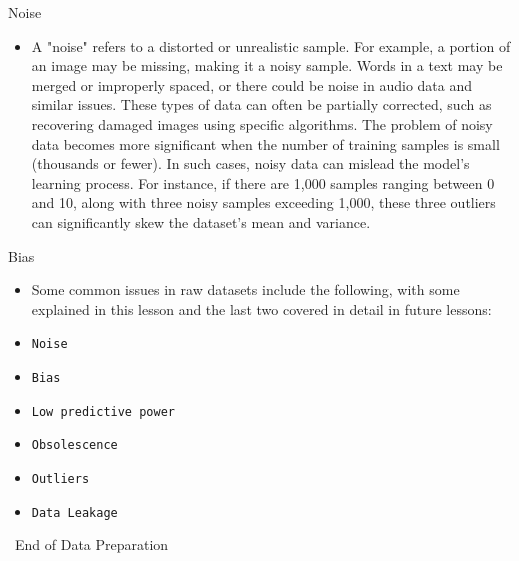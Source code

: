 \documentclass[serif, aspectratio=169]{beamer}
\begin{document}
\begin{frame}{Noise}
    \begin{itemize}
        \item A "noise" refers to a distorted or unrealistic sample. For example, a portion of an image may be missing, making it a noisy sample. Words in a text may be merged or improperly spaced, or there could be noise in audio data and similar issues. These types of data can often be partially corrected, such as recovering damaged images using specific algorithms. The problem of noisy data becomes more significant when the number of training samples is small (thousands or fewer). In such cases, noisy data can mislead the model's learning process. For instance, if there are 1,000 samples ranging between 0 and 10, along with three noisy samples exceeding 1,000, these three outliers can significantly skew the dataset's mean and variance.
    \end{itemize}
\end{frame}

\begin{frame}{Bias}
    \begin{itemize}
        \item Some common issues in raw datasets include the following, with some explained in this lesson and the last two covered in detail in future lessons:
        \item \texttt{\color{red}Noise}
        \item \texttt{\color{red}Bias}
        \item \texttt{\color{red}Low predictive power}
        \item \texttt{\color{red}Obsolescence}
         \item \texttt{\color{red}Outliers}
        \item \texttt{\color{red}Data Leakage}
    \end{itemize}
\end{frame}




\begin{frame}
    \begin{center}
        {\Huge\ End of Data Preparation}
    \end{center}
\end{frame}
\end{document}
